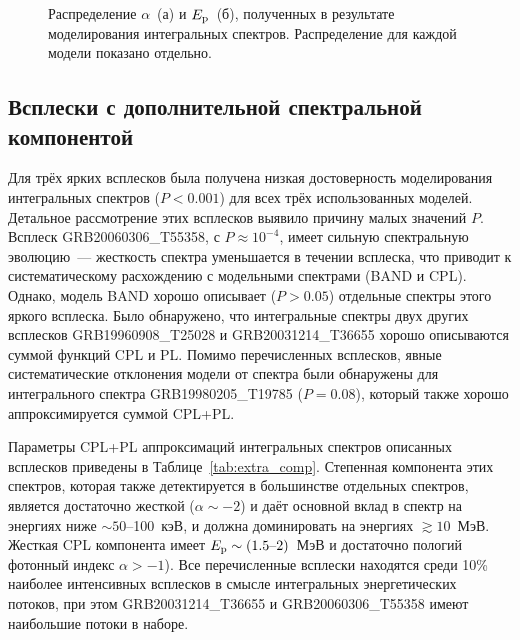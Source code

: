 \begin{figure}
	\begin{minipage}[h]{0.5\textwidth}
    \end{minipage}
    \hfill
    \begin{minipage}[h]{0.5\textwidth}
	\end{minipage}
    \caption{
    Распределение $\alpha$~(а) и $E_{\mathrm{p}}$~(б), полученных 
    в результате моделирования интегральных спектров. Распределение для каждой модели
    показано отдельно.
    \label{fig:par_dist} }
\end{figure}

\subsection{Всплески с дополнительной спектральной компонентой}
Для трёх ярких всплесков была получена низкая достоверность моделирования 
интегральных спектров ($P<0.001$) для всех трёх использованных моделей. 
Детальное рассмотрение этих всплесков выявило причину малых значений $P$.
Всплеск GRB20060306\_T55358, с $P \approx 10^{-4}$, имеет сильную 
спектральную эволюцию~--- жесткость спектра уменьшается в течении всплеска, 
что приводит к систематическому расхождению с модельными спектрами (BAND и CPL).
Однако, модель BAND хорошо описывает ($P>0.05$) отдельные спектры этого яркого всплеска.
Было обнаружено, что интегральные спектры двух других всплесков GRB19960908\_T25028 и GRB20031214\_T36655
хорошо описываются суммой функций CPL и PL.
Помимо перечисленных всплесков, явные систематические отклонения модели от спектра
были обнаружены для интегрального спектра GRB19980205\_T19785 ($P=0.08$), 
который также хорошо аппроксимируется суммой CPL+PL.
 
Параметры CPL+PL аппроксимаций интегральных спектров описанных всплесков приведены в Таблице~\ref{tab:extra_comp}. 
Степенная компонента этих спектров, которая также детектируется в большинстве отдельных спектров,
является достаточно жесткой ($\alpha \sim -2$) и даёт основной вклад в спектр на  
энергиях ниже $\sim 50$--100~кэВ, и должна доминировать на энергиях $\gtrsim 10$~МэВ.
Жесткая CPL компонента имеет $E_{\mathrm{p}}\sim(1.5\textrm{--}2)$~МэВ и достаточно пологий
фотонный индекс $\alpha > -1$).
Все перечисленные всплески находятся среди 10\% наиболее интенсивных всплесков
в смысле интегральных энергетических потоков, при этом
GRB20031214\_T36655 и GRB20060306\_T55358 имеют наибольшие потоки в наборе.

